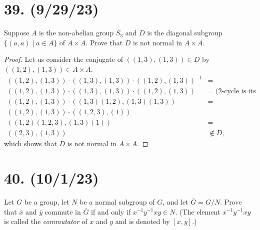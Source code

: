 \documentclass{article}
\begin{document}
\section*{39. (9/29/23)}

Suppose $A$ is the non-abelian group $S_3$ and $D$ is the diagonal subgroup $\{ (a, a) \mid a \in A \}$ of $A \times A$. Prove that $D$ is not normal in $A \times A$.

\begin{proof}
    Let us consider the conjugate of $((1, 3), (1, 3)) \in D$ by $((1, 2), (1, 3)) \in A \times A$.
    \begin{align*}
        ((1, 2), (1, 3)) \cdot ((1, 3), (1, 3)) \cdot ((1, 2), (1, 3))^{-1} &= \\
        ((1, 2), (1, 3)) \cdot ((1, 3), (1, 3)) \cdot ((1, 2), (1, 3)) &= \text{ (2-cycle is its own inverse)} \\
        ((1, 2), (1, 3)) \cdot ((1, 3)(1, 2), (1, 3)(1, 3)) &= \\
        ((1, 2), (1, 3)) \cdot ((1, 2, 3), (1)) &= \\
        ((1, 2)(1, 2, 3), (1, 3)(1)) &= \\
        ((2, 3), (1, 3)) &\notin D,
    \end{align*}
    which shows that $D$ is not normal in $A \times A$.
\end{proof}

\section*{40. (10/1/23)}

Let $G$ be a group, let $N$ be a normal subgroup of $G$, and let $\overline{G} = G/N$. Prove that $\overline{x}$ and $\overline{y}$ commute in $\overline{G}$ if and only if $x^{-1}y^{-1}xy \in N$. (The element $x^{-1}y^{-1}xy$ is called the \emph{commutator} of $x$ and $y$ and is denoted by $[x, y]$.)
\end{document}

